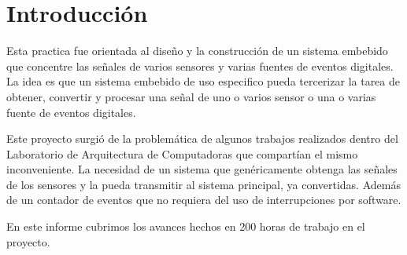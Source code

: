\section{Introducci\'on} %
\label{sec:introduccion}

Esta practica fue orientada al dise\~no y la construcci\'on de un sistema embebido que concentre las se\~nales de varios sensores y varias fuentes de eventos digitales. La idea es que un sistema embebido de uso especifico pueda tercerizar la tarea de obtener, convertir y procesar una se\~nal de uno o varios sensor o una o varias fuente de eventos digitales.

Este proyecto surgi\'o de la problem\'atica de algunos trabajos realizados dentro del Laboratorio de Arquitectura de Computadoras que compart\'ian el mismo inconveniente. La necesidad de un sistema que gen\'ericamente obtenga las se\~nales de los sensores y la pueda transmitir al sistema principal, ya convertidas. Adem\'as de un contador de eventos que no requiera del uso de interrupciones por software.

En este informe cubrimos los avances hechos en 200 horas de trabajo en el proyecto.
